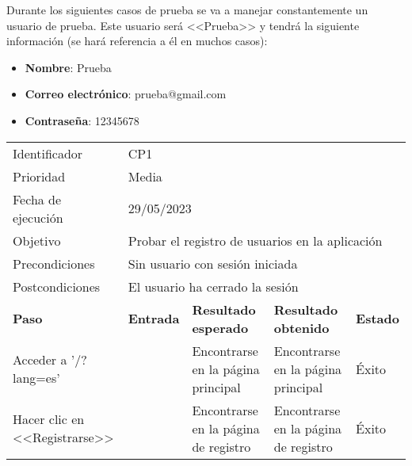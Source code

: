 Durante los siguientes casos de prueba se va a manejar constantemente un usuario
de prueba. Este usuario será <<Prueba>> y tendrá la siguiente información (se
hará referencia a él en muchos casos):
\vspace{-0.4cm}
\begin{itemize}
    \item \textbf{Nombre}: Prueba
    \item \textbf{Correo electrónico}: prueba@gmail.com
    \item \textbf{Contraseña}: 12345678
\end{itemize}

\clearpage
\begin{table}[H]
\begin{tabular}{p{}p{}p{}p{}p{}}
\rowcolor{gray!25}
Identificador   & \multicolumn{4}{l}{CP1}                                                    \\
Prioridad   & \multicolumn{4}{l}{Media}                                                    \\
\rowcolor{gray!25}
Fecha de ejecución   & \multicolumn{4}{l}{29/05/2023}                                                    \\
Objetivo        & \multicolumn{4}{l}{Probar el registro de usuarios en la aplicación}                                                     \\
\rowcolor{gray!25}
Precondiciones  & \multicolumn{4}{l}{Sin usuario con sesión iniciada}                                                     \\
Postcondiciones & \multicolumn{4}{l}{El usuario ha cerrado la sesión}                                                     \\ \hline
\rowcolor{gray!25}
\textbf{Paso}   & \textbf{Entrada} & \textbf{Resultado esperado} & \textbf{Resultado obtenido} & \textbf{Estado} \\ \hline
Acceder a '/?lang=es'                               &                                                                                                         & Encontrarse en la página principal                                   & Encontrarse en la página principal                                   & Éxito                            \\ \hline
Hacer clic en <<Registrarse>>                       &                                                                                                          & Encontrarse en la página de registro                                 & Encontrarse en la página de registro                                 & Éxito                            \\ \hline

\end{tabular}
\end{table}
